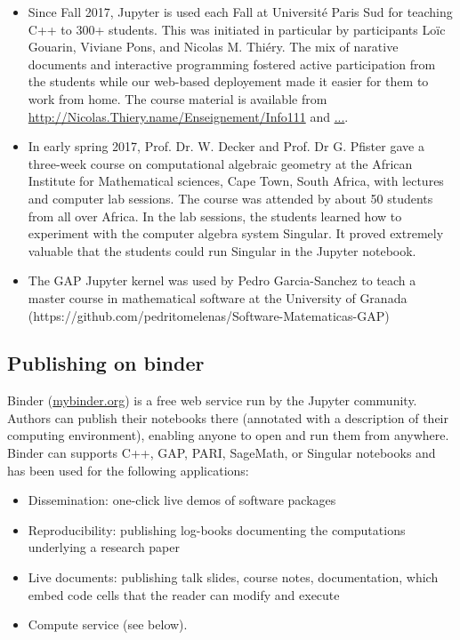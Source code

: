 \documentclass{deliverablereport}
\begin{document}
\begin{itemize}
\item Since Fall 2017, Jupyter is used each Fall at Université Paris Sud for teaching C++ to 300+ students.
This was initiated in particular by \OpenDreamKit participants Loïc Gouarin, Viviane Pons, and Nicolas M. Thiéry.
The mix of narative documents and interactive programming fostered active participation from the students while our web-based deployement made it easier for them to work from home.
The course material is available from \url{http://Nicolas.Thiery.name/Enseignement/Info111} and \url{...}.

\item In early spring 2017, Prof. Dr. W. Decker and Prof. Dr G. Pfister gave a
three-week course on computational algebraic geometry at the
African Institute for Mathematical sciences, Cape Town, South Africa,
with lectures and computer lab sessions. The course was attended by
about 50 students from all over Africa. In the lab sessions, the students
learned how to experiment with the computer algebra system Singular. It
proved extremely valuable that the students could run Singular in the
Jupyter notebook. %

\item The GAP Jupyter kernel was used by Pedro Garcia-Sanchez to teach a master course in mathematical software at the University of Granada (https://github.com/pedritomelenas/Software-Matematicas-GAP)

\end{itemize}

\subsection{Publishing on binder}

Binder (\url{mybinder.org}) is a free web service run by the Jupyter community. Authors can publish their notebooks there (annotated with a description of their computing environment), enabling anyone to open and run them from anywhere. Binder can supports C++, GAP, PARI, SageMath, or Singular notebooks and has been used for the following applications:

\begin{itemize}
\item Dissemination: one-click live demos of software packages
\item Reproducibility: publishing log-books documenting the computations underlying a research paper
\item Live documents: publishing talk slides, course notes, documentation, which embed code cells that the reader can modify and execute
\item Compute service (see below).
\end{itemize}
\end{document}

